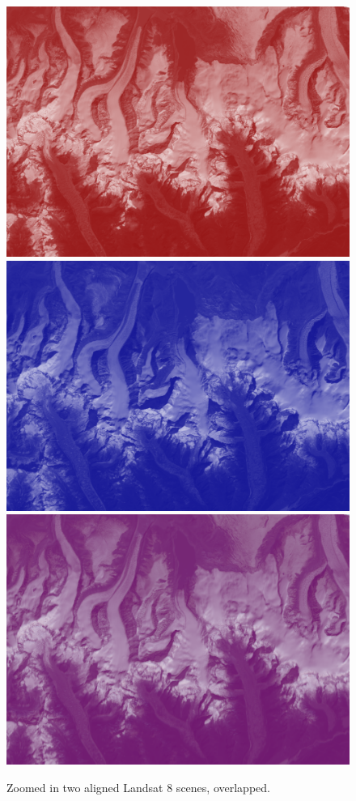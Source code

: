 \documentclass[12pt, a4paper]{report}
\begin{document}
  	\begin{figure}[H]
  		\includegraphics[width=\linewidth]{red_tiny_aligned.png}
  		\endminipage\hfill
  		\includegraphics[width=\linewidth]{blue_tiny_aligned.png}
  		\endminipage\hfill
  		\includegraphics[width=\linewidth]{purple_tiny_aligned.png}
  		\endminipage
  		\caption{Zoomed in two aligned Landsat 8 scenes, overlapped.}\label{fig:tiny_aligned}
  	\end{figure}
  	
\end{document}
